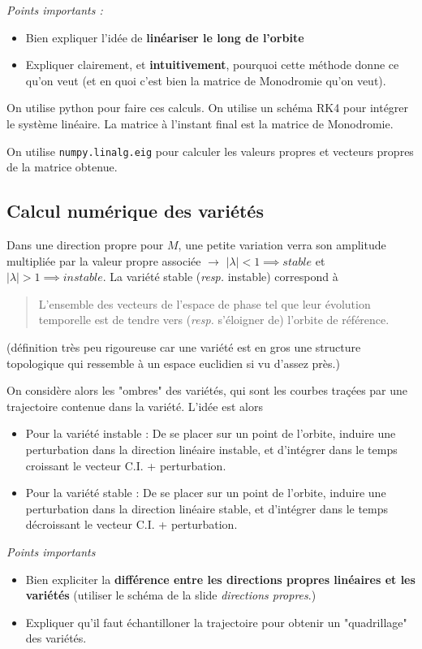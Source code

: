 \documentclass[12pt]{article}
\begin{document}
	\textit{Points importants :}
	\begin{itemize}
		\item Bien expliquer l'idée de \textbf{linéariser le long de l'orbite}
		\item Expliquer clairement, et \textbf{intuitivement}, pourquoi cette méthode donne ce qu'on veut (et en quoi c'est bien la matrice de Monodromie qu'on veut).
	\end{itemize}
	
	On utilise python pour faire ces calculs. On utilise un schéma RK4 pour intégrer le système linéaire. La matrice à l'instant final est la matrice de Monodromie.
	
	On utilise \verb|numpy.linalg.eig| pour calculer les valeurs propres et vecteurs propres de la matrice obtenue.
	
	
	\subsection{Calcul numérique des variétés}
	Dans une direction propre pour $M$, une petite variation verra son amplitude multipliée par la valeur propre associée $\to$ $|\lambda| < 1 \implies stable$ et $|\lambda| > 1 \implies instable$. La variété stable (\textit{resp.} instable) correspond à 
	\begin{quotation}
		L'ensemble des vecteurs de l'espace de phase tel que leur évolution temporelle est de tendre vers (\textit{resp.} s'éloigner de) l'orbite de référence.
	\end{quotation}
	(définition très peu rigoureuse car une variété est en gros une structure topologique qui ressemble à un espace euclidien si vu d'assez près.)
	\bigskip
	
	On considère alors les "ombres" des variétés, qui sont les courbes traçées par une trajectoire contenue dans la variété. L'idée est alors
	\begin{itemize}
		\item Pour la variété instable : De se placer sur un point de l'orbite, induire une perturbation dans la direction linéaire instable, et d'intégrer dans le temps croissant le vecteur C.I. + perturbation.
		\item Pour la variété stable : De se placer sur un point de l'orbite, induire une perturbation dans la direction linéaire stable, et d'intégrer dans le temps décroissant le vecteur C.I. + perturbation.
	\end{itemize}
	\bigskip
	
	\textit{Points importants}
	\begin{itemize}
		\item Bien expliciter la \textbf{différence entre les directions propres linéaires et les variétés} (utiliser le schéma de la slide \textit{directions propres}.)
		\item Expliquer qu'il faut échantilloner la trajectoire pour obtenir un "quadrillage" des variétés.
	\end{itemize}
	
\end{document}
